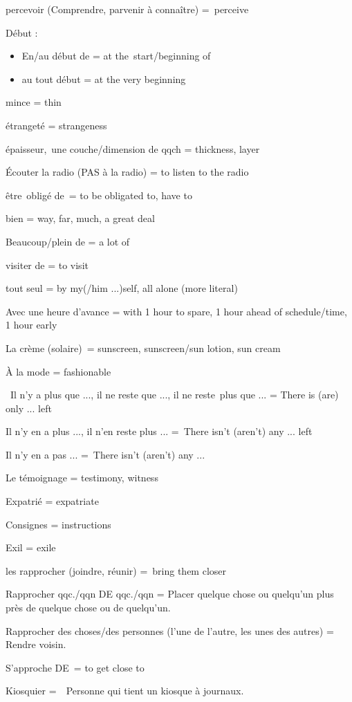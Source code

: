 {percevoir (}Comprendre, parvenir à connaître{) =~}{perceive}

{Début :}

\begin{itemize}
\item
  {En/au début de = at the~start/beginning of~}
\item
  {au tout début = at the very beginning}
\end{itemize}

{mince = thin}

{étrangeté = strangeness}

{épaisseur,~}{une couche/dimension de qqch} {= thickness, layer}

{Écouter la radio (PAS à la radio) = to listen to the radio~}

{être}~obligé de~= to be obligated to, have to~

bien = way, far, much, a great deal

Beaucoup/plein de = a lot of~

visiter de = to visit

tout seul = by my(/him ...)self, all alone (more literal)

Avec une heure d'avance = with 1 hour to spare, 1 hour ahead of
schedule/time, 1 hour early

La crème (solaire)~= sunscreen, sunscreen/sun lotion, sun cream~

À la mode = fashionable~

~Il n'y a plus que ..., il ne reste que ..., il ne reste~plus que ... =
There is (are) only ... left

Il n'y en a plus ..., il n'en reste plus ... =~There isn't (aren't) any
... left

Il n'y en a pas ... =~There isn't (aren't) any ...~

Le témoignage = testimony, witness

Expatrié = expatriate

Consignes = instructions

Exil = exile

les rapprocher (joindre, réunir) =~bring them closer

Rapprocher qqc./qqn DE qqc./qqn = Placer quelque chose ou quelqu'un plus
près de quelque chose ou de quelqu'un.

Rapprocher des choses/des personnes (l'une de l'autre, les unes des
autres) = Rendre voisin.

S'approche DE~= to get close to

Kiosquier =~~{Pers}{onne qui tie}{nt un kiosque à journaux.}

